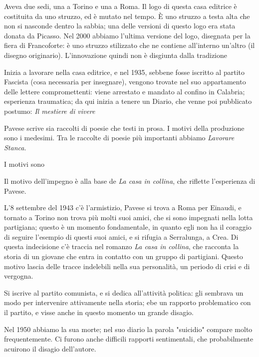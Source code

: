 Aveva due sedi, una a Torino e una a Roma. Il logo di questa casa editrice è costituita da uno struzzo, ed è mutato nel tempo. È uno struzzo a testa alta che non si nasconde dentro la sabbia; una delle versioni di questo logo era stata donata da Picasso.
Nel 2000 abbiamo l'ultima versione del logo, disegnata per la fiera di Francoforte: è uno struzzo stilizzato che ne contiene all'interno un'altro (il disegno originario). L'innovazione quindi non è disgiunta dalla tradizione

\vspace{1em}

Inizia a lavorare nella casa editrice, e nel 1935, sebbene fosse iscritto al partito Fascista (cosa necessaria per insegnare), vengono trovate nel suo appartamento delle lettere compromettenti: viene arrestato e mandato al confino in Calabria; esperienza traumatica; da qui inizia a tenere un Diario, che venne poi pubblicato postumo: \textit{Il mestiere di vivere}

Pavese scrive sia raccolti di poesie che testi in prosa. I motivi della produzione sono i medesimi. Tra le raccolte di poesie più importanti abbiamo \textit{Lavorare Stanca}.

I motivi sono

Il motivo dell'impegno è alla base de \textit{La casa in collina}, che riflette l'esperienza di Pavese.

L'8 settembre del 1943 c'è l'armistizio, Pavese si trova a Roma per Einaudi, e tornato a Torino non trova più molti suoi amici, che si sono impegnati nella lotta partigiana; questo è un momento fondamentale, in quanto egli non ha il coraggio di seguire l'esempio di questi suoi amici, e si rifugia a Serralunga, a Crea. Di questa indecisione c'è traccia nel romanzo \textit{La casa in collina}, che racconta la storia di un giovane che entra in contatto con un gruppo di partigiani.
Questo motivo lascia delle tracce indelebili nella sua personalità, un periodo di crisi e di vergogna.

Si iscrive al partito comunista, e si dedica all'attività politica: gli sembrava un modo per intervenire attivamente nella storia; ebe un rapporto problematico con il partito, e visse anche in questo momento un grande disagio.

Nel 1950 abbiamo la sua morte; nel suo diario la parola "suicidio" compare molto frequentemente. Ci furono anche difficili rapporti sentimentali, che probabilmente acuirono il disagio dell'autore.

